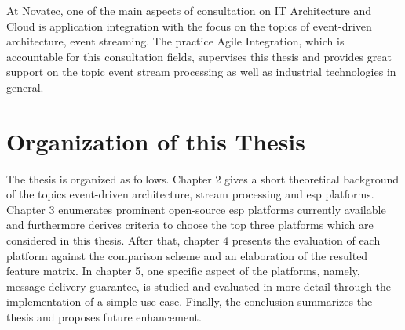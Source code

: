 At Novatec, one of the main aspects of consultation on IT Architecture and Cloud is application integration with the focus on the topics of event-driven architecture, event streaming. The practice Agile Integration, which is accountable for this consultation fields, supervises this thesis and provides great support on the topic event stream processing as well as industrial technologies in general. 

\section{Organization of this Thesis}
The thesis is organized as follows. Chapter 2 gives a short theoretical background of the topics event-driven architecture, stream processing and \acrshort{esp} platforms. Chapter 3 enumerates prominent open-source \acrshort{esp} platforms currently available and furthermore derives criteria to choose the top three platforms which are considered in this thesis. After that, chapter 4 presents the evaluation of each platform against the comparison scheme and an elaboration of the resulted feature matrix. In chapter 5, one specific aspect of the platforms, namely, message delivery guarantee, is studied and evaluated in more detail through the implementation of a simple use case. Finally, the conclusion summarizes the thesis and proposes future enhancement.

